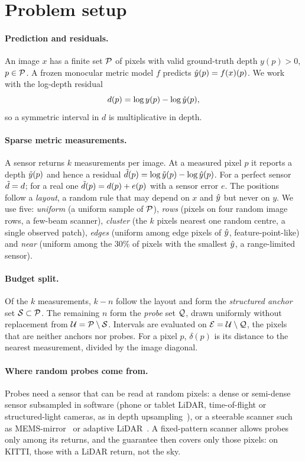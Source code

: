 \section{Problem setup}
\label{sec:setup}

\paragraph{Prediction and residuals.}
An image $x$ has a finite set $\mathcal{P}$ of pixels with valid ground-truth depth $y(p)>0$, $p\in\mathcal{P}$.
A frozen monocular metric model $f$ predicts $\hat{y}(p)=f(x)(p)$.
We work with the log-depth residual
\begin{equation}
d(p) = \log y(p) - \log \hat{y}(p),
\label{eq:residual}
\end{equation}
so a symmetric interval in $d$ is multiplicative in depth.

\paragraph{Sparse metric measurements.}
A sensor returns $k$ measurements per image.
At a measured pixel $p$ it reports a depth $\tilde{y}(p)$ and hence a residual $\tilde{d}(p)=\log\tilde{y}(p)-\log\hat{y}(p)$.
For a perfect sensor $\tilde{d}=d$; for a real one $\tilde{d}(p)=d(p)+e(p)$ with a sensor error $e$.
The positions follow a \emph{layout}, a random rule that may depend on $x$ and $\hat{y}$ but never on $y$.
We use five: \emph{uniform} (a uniform sample of $\mathcal{P}$), \emph{rows} (pixels on four random image rows, a few-beam scanner), \emph{cluster} (the $k$ pixels nearest one random centre, a single observed patch), \emph{edges} (uniform among edge pixels of $\hat{y}$, feature-point-like) and \emph{near} (uniform among the 30\% of pixels with the smallest $\hat{y}$, a range-limited sensor).

\paragraph{Budget split.}
Of the $k$ measurements, $k-n$ follow the layout and form the \emph{structured anchor} set $\mathcal{S}\subset\mathcal{P}$.
The remaining $n$ form the \emph{probe} set $\mathcal{Q}$, drawn uniformly without replacement from $\mathcal{U}=\mathcal{P}\setminus\mathcal{S}$.
Intervals are evaluated on $\mathcal{E}=\mathcal{U}\setminus\mathcal{Q}$, the pixels that are neither anchors nor probes.
For a pixel $p$, $\delta(p)$ is its distance to the nearest measurement, divided by the image diagonal.

\paragraph{Where random probes come from.}
Probes need a sensor that can be read at random pixels: a dense or semi-dense sensor subsampled in software (phone or tablet LiDAR, time-of-flight or structured-light cameras, as in depth upsampling~\cite{baruch2021arkitscenes}), or a steerable scanner such as MEMS-mirror~\cite{pittaluga2020mems} or adaptive LiDAR~\cite{bergman2020adaptivelidar}.
A fixed-pattern scanner allows probes only among its returns, and the guarantee then covers only those pixels: on KITTI, those with a LiDAR return, not the sky.

